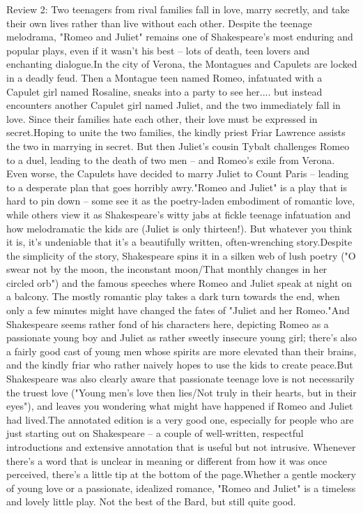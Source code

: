 \documentclass[12pt, a4paper[]{article}
\begin{document}
\begin{itemize}
{    \item Review 2: Two teenagers from rival families fall in love, marry secretly, and take their own lives rather than live without each other. Despite the teenage melodrama, "Romeo and Juliet" remains one of Shakespeare's most enduring and popular plays, even if it wasn't his best -- lots of death, teen lovers and enchanting dialogue.In the city of Verona, the Montagues and Capulets are locked in a deadly feud. Then a Montague teen named Romeo, infatuated with a Capulet girl named Rosaline, sneaks into a party to see her.... but instead encounters another Capulet girl named Juliet, and the two immediately fall in love. Since their families hate each other, their love must be expressed in secret.Hoping to unite the two families, the kindly priest Friar Lawrence assists the two in marrying in secret. But then Juliet's cousin Tybalt challenges Romeo to a duel, leading to the death of two men -- and Romeo's exile from Verona. Even worse, the Capulets have decided to marry Juliet to Count Paris -- leading to a desperate plan that goes horribly awry."Romeo and Juliet" is a play that is hard to pin down -- some see it as the poetry-laden embodiment of romantic love, while others view it as Shakespeare's witty jabs at fickle teenage infatuation and how melodramatic the kids are (Juliet is only thirteen!). But whatever you think it is, it's undeniable that it's a beautifully written, often-wrenching story.Despite the simplicity of the story, Shakespeare spins it in a silken web of lush poetry ("O swear not by the moon, the inconstant moon/That monthly changes in her circled orb") and the famous speeches where Romeo and Juliet speak at night on a balcony. The mostly romantic play takes a dark turn towards the end, when only a few minutes might have changed the fates of "Juliet and her Romeo."And Shakespeare seems rather fond of his characters here, depicting Romeo as a passionate young boy and Juliet as rather sweetly insecure young girl; there's also a fairly good cast of young men whose spirits are more elevated than their brains, and the kindly friar who rather naively hopes to use the kids to create peace.But Shakespeare was also clearly aware that passionate teenage love is not necessarily the truest love ("Young men's love then lies/Not truly in their hearts, but in their eyes"), and leaves you wondering what might have happened if Romeo and Juliet had lived.The annotated edition is a very good one, especially for people who are just starting out on Shakespeare -- a couple of well-written, respectful introductions and extensive annotation that is useful but not intrusive. Whenever there's a word that is unclear in meaning or different from how it was once perceived, there's a little tip at the bottom of the page.Whether a gentle mockery of young love or a passionate, idealized romance, "Romeo and Juliet" is a timeless and lovely little play. Not the best of the Bard, but still quite good.
}
\end{itemize}
\end{document}
